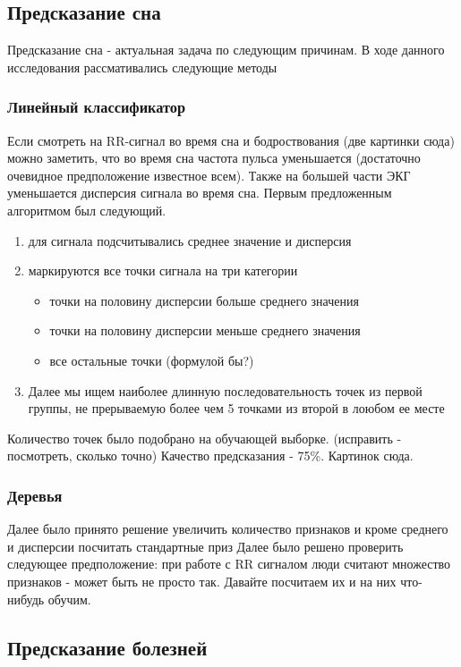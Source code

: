 \subsection{Предсказание сна}
Предсказание сна - актуальная задача по следующим причинам.
В ходе данного исследования рассмативались следующие методы
\subsubsection{Линейный классификатор}
Если смотреть на RR-сигнал во время сна и бодроствования (две картинки сюда) можно заметить, что во время сна частота пульса уменьшается (достаточно очевидное предположение известное всем). Также на большей части ЭКГ уменьшается дисперсия сигнала во время сна.
Первым предложенным алгоритмом был следующий.
\begin{enumerate}
	\item для сигнала подсчитывались среднее значение и дисперсия
	\item маркируются все точки сигнала на три категории
	\begin{itemize}
		\item точки на половину дисперсии больше среднего значения
		\item точки на половину дисперсии меньше среднего значения
		\item все остальные точки (формулой бы?)
	\end{itemize}
	\item Далее мы ищем наиболее длинную последовательность точек из первой группы, не прерываемую более чем 5 точками из второй в лоюбом ее месте
\end{enumerate}
Количество точек было подобрано на обучающей выборке. (исправить - посмотреть, сколько точно)
Качество предсказания - 75\%.
Картинок сюда.
\subsubsection{Деревья}
Далее было принято решение увеличить количество признаков и кроме среднего и дисперсии посчитать стандартные приз
Далее было решено проверить следующее предположение: при работе с RR сигналом люди считают множество признаков - может быть не просто так. Давайте посчитаем их и на них что-нибудь обучим.
\subsection{Предсказание болезней}